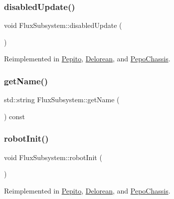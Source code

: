 \subsubsection{\texorpdfstring{disabled\+Update()}{disabledUpdate()}}
{\footnotesize\ttfamily void Flux\+Subsystem\+::disabled\+Update (\begin{DoxyParamCaption}{ }\end{DoxyParamCaption})\hspace{0.3cm}{\ttfamily [virtual]}}



Reimplemented in \hyperlink{classPepito_afc29a2b7ac94a47381ca213dc2993c39}{Pepito}, \hyperlink{classDelorean_acc8f7d93dd894233d16f34316d363983}{Delorean}, and \hyperlink{classPepoChassis_a33af04df9c2396d6197f3298172763d9}{Pepo\+Chassis}.

\mbox{\label{classFluxSubsystem_a661009e388711cd134d519160d1633ac}} 
\subsubsection{\texorpdfstring{get\+Name()}{getName()}}
{\footnotesize\ttfamily std\+::string Flux\+Subsystem\+::get\+Name (\begin{DoxyParamCaption}{ }\end{DoxyParamCaption}) const}

\mbox{\label{classFluxSubsystem_aacd5ddfcadda0866d5e838de09a60d63}} 
\subsubsection{\texorpdfstring{robot\+Init()}{robotInit()}}
{\footnotesize\ttfamily void Flux\+Subsystem\+::robot\+Init (\begin{DoxyParamCaption}{ }\end{DoxyParamCaption})\hspace{0.3cm}{\ttfamily [virtual]}}



Reimplemented in \hyperlink{classPepito_a1eed9bef768f3694d8bdfb4f610b8e3a}{Pepito}, \hyperlink{classDelorean_a591e1b68a21a82c7e1cf4e7dbf5294a2}{Delorean}, and \hyperlink{classPepoChassis_a18dd25fff35cf7ccac6b710e329873e6}{Pepo\+Chassis}.

